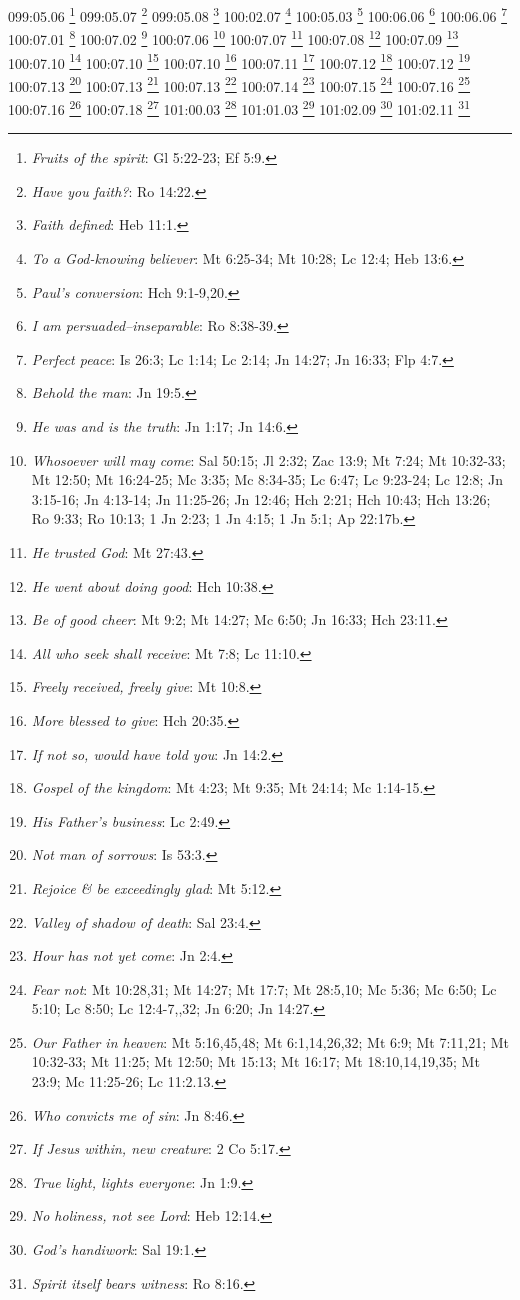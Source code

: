 099:05.06 \footnote{\textit{Fruits of the spirit}: Gl 5:22-23; Ef 5:9.}
099:05.07 \footnote{\textit{Have you faith?}: Ro 14:22.}
099:05.08 \footnote{\textit{Faith defined}: Heb 11:1.}
100:02.07 \footnote{\textit{To a God-knowing believer}: Mt 6:25-34; Mt 10:28; Lc 12:4; Heb 13:6.}
100:05.03 \footnote{\textit{Paul's conversion}: Hch 9:1-9,20.}
100:06.06 \footnote{\textit{I am persuaded--inseparable}: Ro 8:38-39.}
100:06.06 \footnote{\textit{Perfect peace}: Is 26:3; Lc 1:14; Lc 2:14; Jn 14:27; Jn 16:33; Flp 4:7.}
100:07.01 \footnote{\textit{Behold the man}: Jn 19:5.}
100:07.02 \footnote{\textit{He was and is the truth}: Jn 1:17; Jn 14:6.}
100:07.06 \footnote{\textit{Whosoever will may come}: Sal 50:15; Jl 2:32; Zac 13:9; Mt 7:24; Mt 10:32-33; Mt 12:50; Mt 16:24-25; Mc 3:35; Mc 8:34-35; Lc 6:47; Lc 9:23-24; Lc 12:8; Jn 3:15-16; Jn 4:13-14; Jn 11:25-26; Jn 12:46; Hch 2:21; Hch 10:43; Hch 13:26; Ro 9:33; Ro 10:13; 1 Jn 2:23; 1 Jn 4:15; 1 Jn 5:1; Ap 22:17b.}
100:07.07 \footnote{\textit{He trusted God}: Mt 27:43.}
100:07.08 \footnote{\textit{He went about doing good}: Hch 10:38.}
100:07.09 \footnote{\textit{Be of good cheer}: Mt 9:2; Mt 14:27; Mc 6:50; Jn 16:33; Hch 23:11.}
100:07.10 \footnote{\textit{All who seek shall receive}: Mt 7:8; Lc 11:10.}
100:07.10 \footnote{\textit{Freely received, freely give}: Mt 10:8.}
100:07.10 \footnote{\textit{More blessed to give}: Hch 20:35.}
100:07.11 \footnote{\textit{If not so, would have told you}: Jn 14:2.}
100:07.12 \footnote{\textit{Gospel of the kingdom}: Mt 4:23; Mt 9:35; Mt 24:14; Mc 1:14-15.}
100:07.12 \footnote{\textit{His Father's business}: Lc 2:49.}
100:07.13 \footnote{\textit{Not man of sorrows}: Is 53:3.}
100:07.13 \footnote{\textit{Rejoice & be exceedingly glad}: Mt 5:12.}
100:07.13 \footnote{\textit{Valley of shadow of death}: Sal 23:4.}
100:07.14 \footnote{\textit{Hour has not yet come}: Jn 2:4.}
100:07.15 \footnote{\textit{Fear not}: Mt 10:28,31; Mt 14:27; Mt 17:7; Mt 28:5,10; Mc 5:36; Mc 6:50; Lc 5:10; Lc 8:50; Lc 12:4-7,,32; Jn 6:20; Jn 14:27.}
100:07.16 \footnote{\textit{Our Father in heaven}: Mt 5:16,45,48; Mt 6:1,14,26,32; Mt 6:9; Mt 7:11,21; Mt 10:32-33; Mt 11:25; Mt 12:50; Mt 15:13; Mt 16:17; Mt 18:10,14,19,35; Mt 23:9; Mc 11:25-26; Lc 11:2.13.}
100:07.16 \footnote{\textit{Who convicts me of sin}: Jn 8:46.}
100:07.18 \footnote{\textit{If Jesus within, new creature}: 2 Co 5:17.}
101:00.03 \footnote{\textit{True light, lights everyone}: Jn 1:9.}
101:01.03 \footnote{\textit{No holiness, not see Lord}: Heb 12:14.}
101:02.09 \footnote{\textit{God's handiwork}: Sal 19:1.}
101:02.11 \footnote{\textit{Spirit itself bears witness}: Ro 8:16.}
